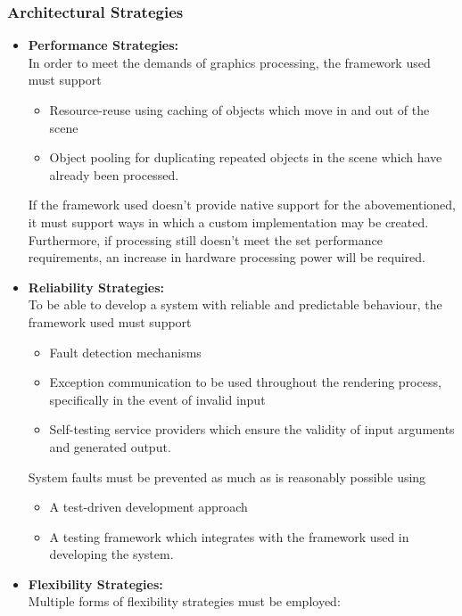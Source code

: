 \documentclass[a4paper,12pt]{article}
\begin{document}
	\subsubsection{Architectural Strategies}
		
		\begin{itemize}
			\item \textbf{Performance Strategies:}\\
				In order to meet the demands of graphics processing, the framework used must support
				\begin{itemize}
					\item Resource-reuse using caching of objects which move in and out of the scene
					\item Object pooling for duplicating repeated objects in the scene which have already been processed.
				\end{itemize}
				If the framework used doesn't provide native support for the abovementioned, it must support ways in which a custom implementation may be created. Furthermore, if processing still doesn't meet the set performance requirements, an increase in hardware processing power will be required.
			\item \textbf{Reliability Strategies:}\\
				To be able to develop a system with reliable and predictable behaviour, the framework used must support
				\begin{itemize}
					\item Fault detection mechanisms
					\item Exception communication to be used throughout the rendering process, specifically in the event of invalid input
					\item Self-testing service providers which ensure the validity of input arguments and generated output.
				\end{itemize} 
				System faults must be prevented as much as is reasonably possible using
				\begin{itemize}
					\item A test-driven development approach
					\item A testing framework which integrates with the framework used in developing the system.
				\end{itemize}
			\item \textbf{Flexibility Strategies:}\\
				Multiple forms of flexibility strategies must be employed:
				

\end{itemize}
\end{document}
